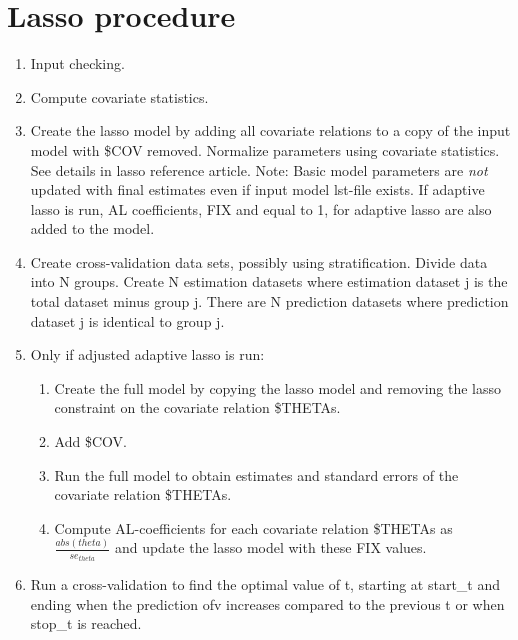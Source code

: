 \section{Lasso procedure}

\begin{enumerate}
\item Input checking.
\item Compute covariate statistics.
\item Create the lasso model by adding all covariate relations to a copy of the input model with \$COV removed. 
Normalize parameters using covariate statistics. See details in lasso reference article. 
Note: Basic model parameters are \emph{not} updated with final estimates even if input model
lst-file exists. If adaptive lasso is run, AL coefficients, FIX and equal to 1, 
for adaptive lasso are also added to the model.
\item Create cross-validation data sets, possibly using stratification. Divide data into N groups. Create N estimation datasets where estimation dataset j is the total dataset minus group j. There are N prediction datasets where prediction dataset j is identical to group j. 
\item Only if adjusted adaptive lasso is run: 
\begin{enumerate}
\item Create the full model by copying the lasso model and removing the
lasso constraint on the covariate relation \$THETAs. 
\item Add \$COV. 
\item Run the full model to obtain estimates and standard errors of the covariate relation \$THETAs.
\item Compute AL-coefficients for each covariate relation \$THETAs 
as $\frac{abs(theta)}{se_{theta}}$
and update the lasso model with these FIX values.
\end{enumerate}
\item Run a cross-validation to find the optimal value of t, 
starting at start\_t and ending when the prediction ofv increases compared to the
previous t or when stop\_t is reached.

\end{enumerate}
